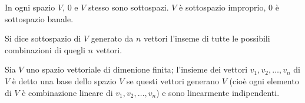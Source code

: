 \begin{example}
In ogni spazio $V$, ${0}$ e $V$ stesso sono sottospazi. $V$ è sottospazio improprio, ${0}$ è sottospazio banale.
\end{example}


\begin{definition}
Si dice sottospazio di $V$ generato da $n$ vettori l'inseme di tutte le possibili combinazioni di quegli $n$ vettori.
\end{definition}


\begin{definition}[Base]
Sia $V$ uno spazio vettoriale di dimenione finita; l'insieme dei vettori  $v_1, v_2, \ldots, v_n$ di $V$ è detto una base dello spazio $V$ se questi vettori generano $V$ (cioè ogni elemento di $V$ è combinazione lineare di $v_1, v_2, \ldots, v_n$) e sono linearmente indipendenti.
\end{definition}
